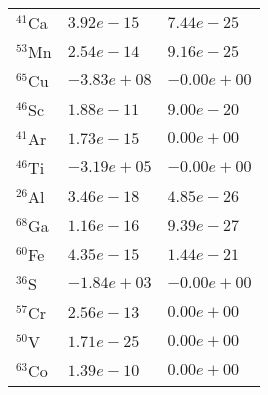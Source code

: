 \begin{tabular}{lll}
 $^{41}$Ca & $3.92e-15 $                                                        & $7.44e-25 $                                                                     \\
 $^{53}$Mn & $2.54e-14 $                                                        & $9.16e-25 $                                                                     \\
 $^{65}$Cu & $-3.83e+08 $                                                       & $-0.00e+00 $                                                                    \\
 $^{46}$Sc & $1.88e-11 $                                                        & $9.00e-20 $                                                                     \\
 $^{41}$Ar & $1.73e-15 $                                                        & $0.00e+00 $                                                                     \\
 $^{46}$Ti & $-3.19e+05 $                                                       & $-0.00e+00 $                                                                    \\
 $^{26}$Al & $3.46e-18 $                                                        & $4.85e-26 $                                                                     \\
 $^{68}$Ga & $1.16e-16 $                                                        & $9.39e-27 $                                                                     \\
 $^{60}$Fe & $4.35e-15 $                                                        & $1.44e-21 $                                                                     \\
 $^{36}$S  & $-1.84e+03 $                                                       & $-0.00e+00 $                                                                    \\
 $^{57}$Cr & $2.56e-13 $                                                        & $0.00e+00 $                                                                     \\
 $^{50}$V  & $1.71e-25 $                                                        & $0.00e+00 $                                                                     \\
 $^{63}$Co & $1.39e-10 $                                                        & $0.00e+00 $                                                                     \\

\end{tabular}
